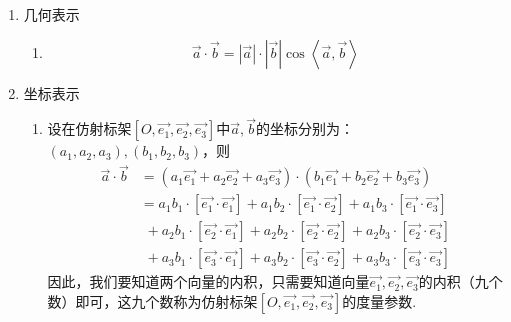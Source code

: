 \begin{enumerate}[1.]
			\setlength{\itemindent}{0em} 
	\setlength{\topsep}{0.01em}
	\setlength{\itemsep}{0.01em}
	\item {\color{dy2}几何表示}
	\begin{enumerate}[]
				\setlength{\itemindent}{1.5em} 
		\setlength{\topsep}{0.01em}
		\setlength{\itemsep}{0.01em}
		\item \begin{equation}
			\overrightarrow{a} \cdot \overrightarrow{b}=|\overrightarrow{a}|\cdot |\overrightarrow{b}| \cos \left\langle \overrightarrow{a},\overrightarrow{b}	\right\rangle 
		\end{equation}
	\end{enumerate}
	\newpage
	\item {\color{dy2}坐标表示}
	\begin{enumerate}[]
				\setlength{\itemindent}{1.5em} 
		\setlength{\topsep}{0.01em}
		\setlength{\itemsep}{0.01em}
		\item 设在仿射标架$[O,\overrightarrow{e_1},\overrightarrow{e_2},\overrightarrow{e_3}]$中$\overrightarrow{a},\overrightarrow{b}$的坐标分别为：$(a_1,a_2,a_3),(b_1,b_2,b_3)$，则
		\begin{equation}
			\begin{aligned}
				\overrightarrow{a} \cdot   \overrightarrow{b}&=(a_1\overrightarrow{e_1}+a_2\overrightarrow{e_2}+a_3\overrightarrow{e_3})\cdot   (b_1\overrightarrow{e_1}+b_2\overrightarrow{e_2}+b_3\overrightarrow{e_3})\\
				&=a_1b_1\cdot  \left[\overrightarrow{e_1}\cdot   \overrightarrow{e_1}\right]+a_1b_2\cdot  \left[\overrightarrow{e_1}\cdot   \overrightarrow{e_2}\right]+a_1b_3\cdot  \left[\overrightarrow{e_1}\cdot  \overrightarrow{e_3}\right]\\
				&\,\,+a_2b_1\cdot  \left[\overrightarrow{e_2}\cdot   \overrightarrow{e_1}\right]+a_2b_2\cdot  \left[\overrightarrow{e_2}\cdot   \overrightarrow{e_2}\right]+a_2b_3\cdot  \left[\overrightarrow{e_2}\cdot  \overrightarrow{e_3}\right]\\
				&\,\,+a_3b_1\cdot  \left[\overrightarrow{e_3}\cdot   \overrightarrow{e_1}\right]+a_3b_2\cdot  \left[\overrightarrow{e_3}\cdot   \overrightarrow{e_2}\right]+a_3b_3\cdot  \left[\overrightarrow{e_3}\cdot   \overrightarrow{e_3}\right]
			\end{aligned}
		\end{equation}
		\qquad 因此，我们要知道两个向量的内积，只需要知道向量$\overrightarrow{e_1},\overrightarrow{e_2},\overrightarrow{e_3}$的内积（九个数）即可，这九个数称为{\color{dy}仿射标架$[O,\overrightarrow{e_1},\overrightarrow{e_2},\overrightarrow{e_3}]$的度量参数}. \\

\end{enumerate}
\end{enumerate}

